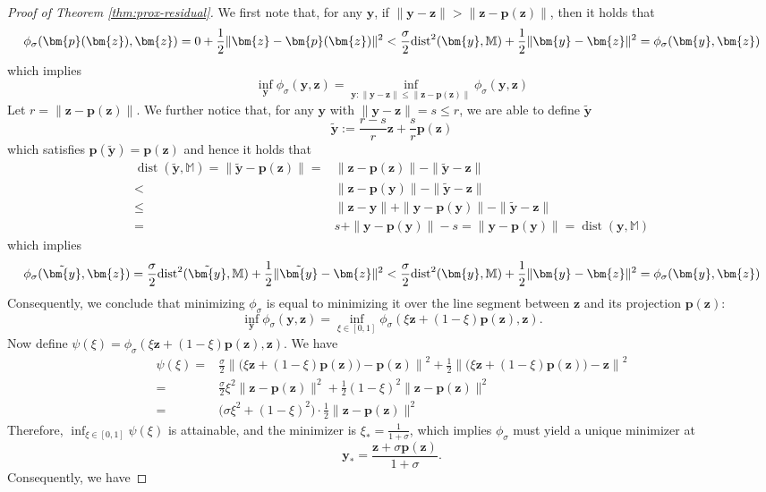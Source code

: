 \documentclass{amsart} %
\def\vp{{\bm{p}}}
\def\vy{{\bm{y}}}
\def\vz{{\bm{z}}}
\def\sM{{\mathbb{M}}}
\newcommand{\dist}{\operatorname{dist}}
\theoremstyle{definition}
\theoremstyle{remark}
\begin{document}
\begin{proof}[Proof of Theorem \ref{thm:prox-residual}]
We first note that, for any $\vy$, if $\|\vy - \vz\| > \|\vz - \vp(\vz)\|$, then it holds that 
\[ \phi_\sigma(\vp(\vz),\vz) = 0 + \frac{1}{2} \|\vz - \vp(\vz)\|^2 < \frac{\sigma}{2} \textup{dist}^2(\vy,\sM) + \frac{1}{2}\|\vy - \vz \|^2 = \phi_\sigma(\vy,\vz)\]
which implies
\[ \inf_{\vy} \phi_\sigma(\vy,\vz) = \inf_{\vy: \|\vy - \vz\| \leq \|\vz - \vp(\vz)\|} \phi_\sigma(\vy,\vz) \]
Let $r = \|\vz - \vp(\vz)\|$. We further notice that, for any $\vy$ with $\|\vy - \vz\| = s \leq r$, we are able to define $\tilde{\vy}$
\[ \tilde{\vy} := \frac{r-s}{r} \vz + \frac{s}{r} \vp(\vz) \]
which satisfies $\vp(\tilde{\vy})=\vp(\vz)$ and hence it holds that
 \begin{align*}
\dist(\tilde{\vy},\sM) = \|\tilde{\vy} - \vp(\vz)\| = & \|\vz - \vp(\vz)\| - \|\tilde{\vy} - \vz\| \\
< & \|\vz - \vp(\vy)\| - \|\tilde{\vy} - \vz\| \\
\leq & \|\vz - \vy\| + \|\vy - \vp(\vy)\| - \|\tilde{\vy} - \vz\| \\
= & s + \|\vy - \vp(\vy)\| - s = \|\vy - \vp(\vy)\| = \dist(\vy,\sM)
 \end{align*}
 which implies
 \[ \phi_\sigma(\tilde{\vy},\vz) =  \frac{\sigma}{2} \textup{dist}^2(\tilde{\vy},\sM) + \frac{1}{2}\|\tilde{\vy} - \vz \|^2 < \frac{\sigma}{2} \textup{dist}^2(\vy,\sM) + \frac{1}{2}\|\vy - \vz \|^2 = \phi_\sigma(\vy,\vz)\]
Consequently, we conclude that minimizing $\phi_\sigma$ is equal to minimizing it over the line segment between $\vz$ and its projection $\vp(\vz)$:
\[\inf_{\vy} \phi_\sigma(\vy,\vz) = \inf_{\xi \in [0,1]} \phi_\sigma(\xi \vz + (1-\xi)\vp(\vz),\vz).\]
Now define $\psi(\xi)=\phi_\sigma(\xi \vz + (1-\xi)\vp(\vz),\vz)$. We have
\[
\begin{aligned}
\psi(\xi)=& \frac{\sigma}{2} \left\| \Big(\xi \vz + (1-\xi)\vp(\vz)\Big) - \vp(\vz)\right\|^2 + \frac{1}{2} \left\| \Big(\xi \vz + (1-\xi)\vp(\vz)\Big) - \vz\right\|^2\\
=& \frac{\sigma}{2} \xi^2 \|\vz-\vp(\vz)\|^2 + \frac{1}{2} (1-\xi)^2 \|\vz-\vp(\vz)\|^2\\
= & \Big(\sigma \xi^2 + (1-\xi)^2\Big) \cdot \frac{1}{2} \|\vz-\vp(\vz)\|^2
\end{aligned}
\]
Therefore, $\inf_{\xi\in[0,1]}\psi(\xi)$ is attainable, and the minimizer is $\xi_\ast = \frac{1}{1+\sigma}$, which implies $\phi_\sigma$ must yield a unique minimizer at 
\[\vy_\ast = \frac{\vz + \sigma \vp(\vz)}{1+\sigma}.\]
Consequently, we have

\end{proof}
\end{document}
